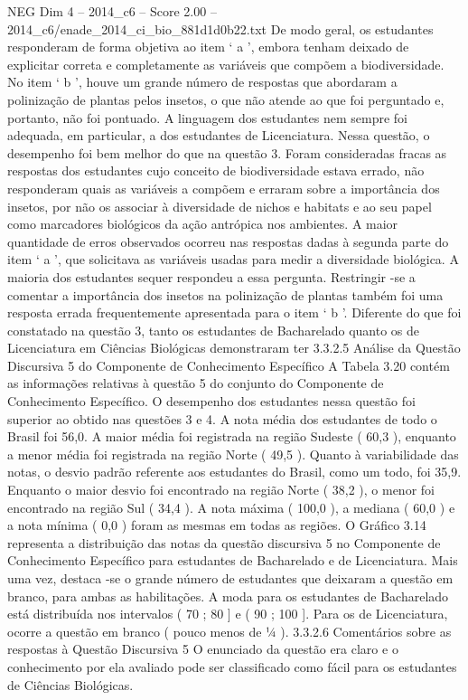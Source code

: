 \begin{textsample}{NEG Dim 4 – 2014\_c6 – Score 2.00 – 2014\_c6/enade\_2014\_ci\_bio\_881d1d0b22.txt}
De modo geral, os estudantes responderam de forma objetiva ao item ‘ a ’, embora tenham deixado de explicitar correta e completamente as variáveis que compõem a biodiversidade.
No item ‘ b ’, houve um grande número de respostas que abordaram a polinização de plantas pelos insetos, o que não atende ao que foi perguntado e, portanto, não foi pontuado.
A linguagem dos estudantes nem sempre foi adequada, em particular, a dos estudantes de Licenciatura.
Nessa questão, o desempenho foi bem melhor do que na questão 3.
Foram consideradas fracas as respostas dos estudantes cujo conceito de biodiversidade estava errado, não responderam quais as variáveis a compõem e erraram sobre a importância dos insetos, por não os associar à diversidade de nichos e habitats e ao seu papel como marcadores biológicos da ação antrópica nos ambientes.
A maior quantidade de erros observados ocorreu nas respostas dadas à segunda parte do item ‘ a ’, que solicitava as variáveis usadas para medir a diversidade biológica.
A maioria dos estudantes sequer respondeu a essa pergunta.
Restringir -se a comentar a importância dos insetos na polinização de plantas também foi uma resposta errada frequentemente apresentada para o item ‘ b ’.
Diferente do que foi constatado na questão 3, tanto os estudantes de Bacharelado quanto os de Licenciatura em Ciências Biológicas demonstraram ter 3.3.2.5 Análise da Questão Discursiva 5 do Componente de Conhecimento Específico A Tabela 3.20 contém as informações relativas à questão 5 do conjunto do Componente de Conhecimento Específico.
O desempenho dos estudantes nessa questão foi superior ao obtido nas questões 3 e 4.
A nota média dos estudantes de todo o Brasil foi 56,0.
A maior média foi registrada na região Sudeste ( 60,3 ), enquanto a menor média foi registrada na região Norte ( 49,5 ).
Quanto à variabilidade das notas, o desvio padrão referente aos estudantes do Brasil, como um todo, foi 35,9.
Enquanto o maior desvio foi encontrado na região Norte ( 38,2 ), o menor foi encontrado na região Sul ( 34,4 ).
A nota máxima ( 100,0 ), a mediana ( 60,0 ) e a nota mínima ( 0,0 ) foram as mesmas em todas as regiões.
O Gráfico 3.14 representa a distribuição das notas da questão discursiva 5 no Componente de Conhecimento Específico para estudantes de Bacharelado e de Licenciatura.
Mais uma vez, destaca -se o grande número de estudantes que deixaram a questão em branco, para ambas as habilitações.
A moda para os estudantes de Bacharelado está distribuída nos intervalos ( 70 ; 80 ] e ( 90 ; 100 ].
Para os de Licenciatura, ocorre a questão em branco ( pouco menos de ¼ ). 3.3.2.6 Comentários sobre as respostas à Questão Discursiva 5 O enunciado da questão era claro e o conhecimento por ela avaliado pode ser classificado como fácil para os estudantes de Ciências Biológicas.

\end{textsample}
